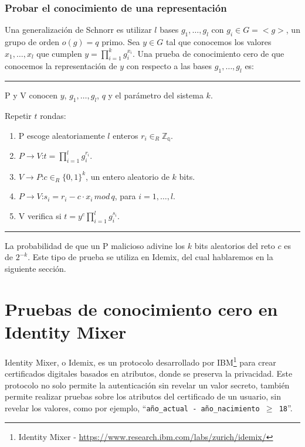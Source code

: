 

\subsubsection{Probar el conocimiento de una representación}\label{reprKP}

Una generalización de Schnorr es utilizar $l$ bases $g_1, \dots, g_l$ con $g_i \in G = <g>$, un grupo de orden $o(g)=q$ primo. Sea $y\in G$ tal que conocemos los valores $x_1,\dots,x_l$ que cumplen $y = \prod_{i=1}^{k} g_i^{x_i}$. Una prueba de conocimiento cero de que conocemos la representación de $y$ con respecto a las bases $g_1, \dots, g_l$ es:


\rule{\textwidth}{1pt}
\begin{algorithm}
	P y V conocen $y$, $g_1, \dots, g_l$, $q$ y el parámetro del sistema $k$.
	
	\hfil
	
	Repetir $t$ rondas:
	\begin{enumerate}
		\item P escoge aleatoriamente $l$ enteros $r_i \in_R \mathbb{Z_q}$.
		\item $P \rightarrow V$:\quad $t=\prod_{i=1}^{l}g_i^{r_i}$.
		\item $V \rightarrow P$:\quad $c \in_R \{0,1\}^k$, un entero aleatorio de $k$ bits.
		\item $P \rightarrow V$:\quad $s_i = r_i - c\cdot x_i \, mod \, q$, para $i=1,\dots,l$.
		\item V verifica si \quad $t = y^c \prod_{i=1}^{l} g_i^{s_i}$.
	\end{enumerate}
	
\end{algorithm}
\rule{\textwidth}{1pt}

La probabilidad de que un P malicioso adivine los $k$ bits aleatorios del reto $c$ es de $2^{-k}$. Este tipo de prueba se utiliza en Idemix, del cual hablaremos en la siguiente sección.


%
%
%
%
%





\section{Pruebas de conocimiento cero en Identity Mixer}

Identity Mixer, o Idemix, es un protocolo desarrollado por IBM\footnote{Identity Mixer - \url{https://www.research.ibm.com/labs/zurich/idemix/}} para crear certificados digitales basados en atributos, donde se preserva la privacidad. Este protocolo no solo permite la autenticación sin revelar un valor secreto, también permite realizar pruebas sobre los atributos del certificado de un usuario, sin revelar los valores, como por ejemplo, ``\texttt{año\_actual - año\_nacimiento $\geq$ 18}''.

